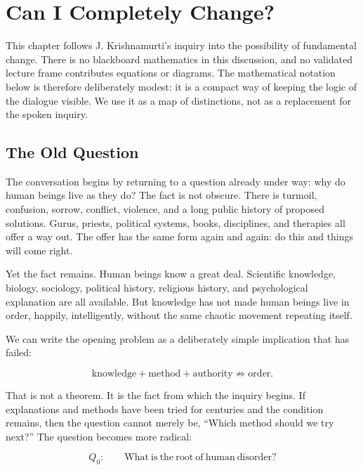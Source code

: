\chapter{Can I Completely Change?}

This chapter follows J. Krishnamurti's inquiry into the possibility of fundamental change. There is no blackboard mathematics in this discussion, and no validated lecture frame contributes equations or diagrams. The mathematical notation below is therefore deliberately modest: it is a compact way of keeping the logic of the dialogue visible. We use it as a map of distinctions, not as a replacement for the spoken inquiry.

\section{The Old Question}

The conversation begins by returning to a question already under way: why do human beings live as they do? The fact is not obscure. There is turmoil, confusion, sorrow, conflict, violence, and a long public history of proposed solutions. Gurus, priests, political systems, books, disciplines, and therapies all offer a way out. The offer has the same form again and again: do this and things will come right.

Yet the fact remains. Human beings know a great deal. Scientific knowledge, biology, sociology, political history, religious history, and psychological explanation are all available. But knowledge has not made human beings live in order, happily, intelligently, without the same chaotic movement repeating itself.

We can write the opening problem as a deliberately simple implication that has failed:

\begin{equation}
\mathrm{knowledge}+\mathrm{method}+\mathrm{authority}
\not\Rightarrow
\mathrm{order}.
\end{equation}

That is not a theorem. It is the fact from which the inquiry begins. If explanations and methods have been tried for centuries and the condition remains, then the question cannot merely be, ``Which method should we try next?'' The question becomes more radical:

\begin{equation}
Q_0:\qquad
\mathrm{What\ is\ the\ root\ of\ human\ disorder?}
\end{equation}

